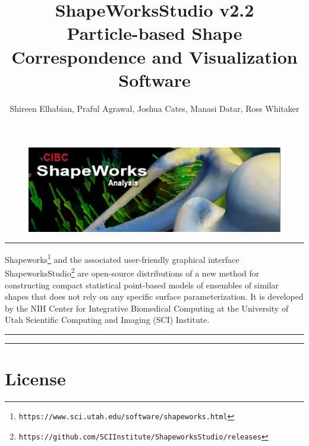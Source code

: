 \documentclass[letterpaper,12pt]{article}   %
\begin{document}
\title{ShapeWorksStudio v2.2 \\ Particle-based Shape Correspondence and Visualization Software}
\begin{figure}
\centering
\includegraphics[scale=0.9]{figs_v2/studio.png}\vspace{0.05in}
\end{figure}



\author{Shireen Elhabian, Praful Agrawal, Joshua Cates, Manasi Datar, Ross Whitaker}
\vspace{0.05in}
\vspace{0.2in}
\address{Scientific Computing and Imaging Institute, School of Computing, \\University of Utah, Salt Lake City, UT 84112, USA}

\vspace{0.2in}

\hrule
\vspace{0.1in}
\noindent Shapeworks\footnote{\texttt{https://www.sci.utah.edu/software/shapeworks.html}} and the associated user-friendly graphical interface ShapeworksStudio\footnote{\texttt{https://github.com/SCIInstitute/ShapeworksStudio/releases}} are open-source distributions of a new method for
constructing compact statistical point-based models of ensembles of similar shapes that does not rely on any specific surface parameterization. It is developed by the NIH Center for Integrative Biomedical Computing at the University of Utah Scientific Computing and Imaging (SCI) Institute.
\vspace{0.1in}
\hrule

\tableofcontents
\hrule
\newpage

\section{License}
\end{document}
